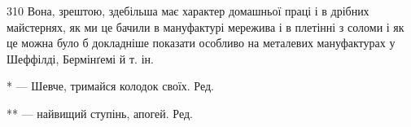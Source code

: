 310    Вона, зрештою, здебільша має характер домашньої праці і в
дрібних майстернях, як ми це бачили в мануфактурі мережива і в плетінні
з соломи і як це можна було б докладніше показати особливо на металевих
мануфактурах у Шеффілді, Бермінґемі й т. ін.

* — Шевче, тримайся колодок своїх. Ред.

** — найвищий ступінь, апогей. Ред.
